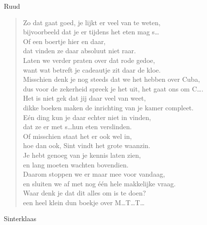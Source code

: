\documentclass[12pt]{brief}
\begin{document}
\begin{letter}{Ruud}
\begin{verse}
Zo dat gaat goed, je lijkt er veel van te weten,\\
bijvoorbeeld dat je er tijdens het eten mag s\ldots\\
Of een boertje hier en daar,\\
dat vinden ze daar absoluut niet raar.\\[0.5em]

Laten we verder praten over dat rode gedoe,\\
want wat betreft je cadeautje zit daar de kloe.\\
Misschien denk je nog steeds dat we het hebben over Cuba,\\
dus voor de zekerheid spreek je het uit, het gaat ons om C\ldots.\\
Het is niet gek dat jij daar veel van weet,\\
dikke boeken maken de inrichting van je kamer compleet.\\
E\'en ding kun je daar echter niet in vinden,\\
dat ze er met s\ldots hun eten verslinden.\\
Of misschien staat het er ook wel in,\\
hoe dan ook, Sint vindt het grote waanzin.\\[0.5em]

Je hebt genoeg van je kennis laten zien,\\
en lang moeten wachten bovendien.\\
Daarom stoppen we er maar mee voor vandaag,\\
en sluiten we af met nog \'e\'en hele makkelijke vraag.\\[0.5em]

Waar denk je dat dit alles om is te doen?\\
een heel klein dun boekje over M\ldots T\ldots T\ldots\\[2em]

\end{verse}


Sinterklaas


\closing{}

\end{letter}
\end{document}
